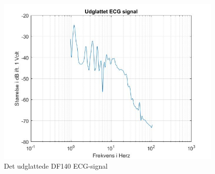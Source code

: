 \begin{figure}[H]
	\centering
	\includegraphics[width=140mm]{figures/ECG/udglattet.jpg}
	\caption{Det udglattede DF140 ECG-signal}
	\label{fig:ECG udglattet}
\end{figure}

